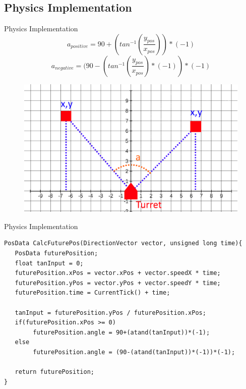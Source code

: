 \subsection{Physics Implementation}
\begin{frame}{Physics Implementation}
\begin{equation}\label{locEq3}
a_{positive}=90+(tan^{-1}(\frac{y_{pos}}{x_{pos}}))*(-1)
\end{equation} 
\begin{equation}\label{locEq4}
a_{negative}=(90-(tan^{-1}(\frac{y_{pos}}{x_{pos}})*(-1))*(-1)
\end{equation} 

\begin{figure}[H]
	\includegraphics[scale=0.25]{figures/CoordinateSystem3.png}
\end{figure}

\end{frame}

\begin{frame}[fragile]{Physics Implementation}
\begin{center}
\begin{minipage}[H]{0.9\linewidth}
 \begin{lstlisting}
PosData CalcFuturePos(DirectionVector vector, unsigned long time){
   PosData futurePosition;
   float tanInput = 0;
   futurePosition.xPos = vector.xPos + vector.speedX * time;
   futurePosition.yPos = vector.yPos + vector.speedY * time;
   futurePosition.time = CurrentTick() + time;

   tanInput = futurePosition.yPos / futurePosition.xPos;
   if(futurePosition.xPos >= 0)
        futurePosition.angle = 90+(atand(tanInput))*(-1);
   else
        futurePosition.angle = (90-(atand(tanInput))*(-1))*(-1);
   
   return futurePosition;
}
 \end{lstlisting} 
\end{minipage}
\end{center}
\end{frame}